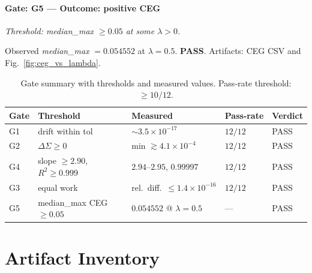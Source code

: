 \documentclass{article}
\newenvironment{vdmgate}[2]{%
  \paragraph{Gate: #1} \emph{Threshold: #2.}%
  \par\noindent}{\medskip}
\begin{document}
\begin{vdmgate}{G5 — Outcome: positive CEG}{\emph{median\_max} $\ge 0.05$ at some $\lambda>0$}
Observed \emph{median\_max} $=0.054552$ at $\lambda=0.5$. \textbf{PASS}. Artifacts: CEG CSV and Fig.~\ref{fig:ceg_vs_lambda}.
\end{vdmgate}

\begin{table}[t]
  \centering
  \caption{Gate summary with thresholds and measured values. Pass‑rate threshold: $\ge 10/12$.}
  \label{tab:gates}
  \begin{tabular}{@{}lllll@{}}
  \toprule
  Gate & Threshold & Measured & Pass‑rate & Verdict \\
  \midrule
  G1 & drift within tol & $\sim 3.5\times 10^{-17}$ & $12/12$ & PASS \\
  G2 & $\Delta \Sigma \ge 0$ & min $\gtrsim 4.1\times 10^{-4}$ & $12/12$ & PASS \\
  G4 & slope $\ge 2.90$, $R^2\ge 0.999$ & $2.94$–$2.95$, $0.99997$ & $12/12$ & PASS \\
  G3 & equal work & rel.\ diff.\ $\le 1.4\times 10^{-16}$ & $12/12$ & PASS \\
  G5 & median\_max CEG $\ge 0.05$ & $0.054552$ @ $\lambda=0.5$ & — & PASS \\
  \bottomrule
  \end{tabular}
\end{table}

\section{Artifact Inventory}
\label{sec:artifacts}
\end{document}

